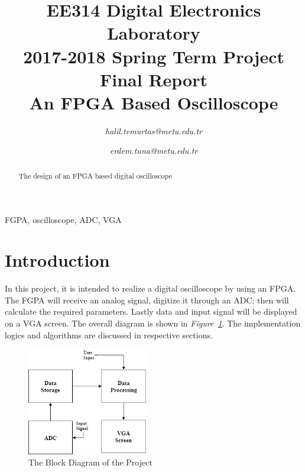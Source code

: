 \documentclass[paper]{IEEEtran}
\begin{document}
\title{EE314 Digital Electronics Laboratory\\
2017-2018 Spring Term Project Final Report\\
An FPGA Based Oscilloscope
}


\author{

\textit{halil.temurtas@metu.edu.tr}

\and

\textit{erdem.tuna@metu.edu.tr}


}

\maketitle

\begin{abstract}

The design of an FPGA based digital oscilloscope 

\end{abstract}

\begin{IEEEkeywords}
FGPA, oscilloscope, ADC, VGA
\end{IEEEkeywords}

\section{Introduction}
\- \indent
	In this project, it is intended to realize a digital oscilloscope by using an FPGA. The FGPA will receive an analog signal, digitize it through an ADC; then will calculate the required parameters. Lastly data and input signal will be displayed on a VGA screen. The overall diagram is shown in \textit{Figure~\ref{fig:overall_diagram}}. The implementation logics and algorithms are discussed in respective sections.

\begin{figure}[h!]
	\setlength{\unitlength}{\textwidth}
	\center 
	\includegraphics[width=0.47\textwidth]{overall_diagram}
	\caption{\label{fig:overall_diagram}The Block Diagram of the Project}
\end{figure}
\end{document}
